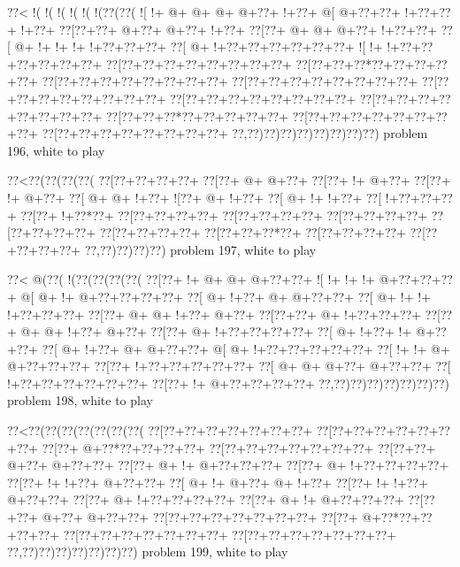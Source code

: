 \vbox{\vbox{\goo
\0??<\- !(\- !(\- !(\- !(\- !(\- !(\0??(\0??(
\- ![\- !+\- @+\- @+\- @+\- @+\0??+\- !+\0??+
\- @[\- @+\0??+\0??+\- !+\0??+\0??+\- !+\0??+
\0??[\0??+\0??+\- @+\0??+\- @+\0??+\- !+\0??+
\0??[\0??+\- @+\- @+\- @+\0??+\- !+\0??+\0??+
\0??[\- @+\- !+\- !+\- !+\- !+\0??+\0??+\0??+
\0??[\- @+\- !+\0??+\0??+\0??+\0??+\0??+\0??+
\- ![\- !+\- !+\0??+\0??+\0??+\0??+\0??+\0??+
\0??[\0??+\0??+\0??+\0??+\0??+\0??+\0??+\0??+
\0??[\0??+\0??+\0??*\0??+\0??+\0??+\0??+\0??+
\0??[\0??+\0??+\0??+\0??+\0??+\0??+\0??+\0??+
\0??[\0??+\0??+\0??+\0??+\0??+\0??+\0??+\0??+
\0??[\0??+\0??+\0??+\0??+\0??+\0??+\0??+\0??+
\0??[\0??+\0??+\0??+\0??+\0??+\0??+\0??+\0??+
\0??[\0??+\0??+\0??+\0??+\0??+\0??+\0??+\0??+
\0??[\0??+\0??+\0??*\0??+\0??+\0??+\0??+\0??+
\0??[\0??+\0??+\0??+\0??+\0??+\0??+\0??+\0??+
\0??[\0??+\0??+\0??+\0??+\0??+\0??+\0??+\0??+
\0??,\0??)\0??)\0??)\0??)\0??)\0??)\0??)\0??)
}
\hfil problem 196, white to play\hfil\break
}

\vbox{\vbox{\goo
\0??<\0??(\0??(\0??(\0??(
\0??[\0??+\0??+\0??+\0??+
\0??[\0??+\- @+\- @+\0??+
\0??[\0??+\- !+\- @+\0??+
\0??[\0??+\- !+\- @+\0??+
\0??[\- @+\- @+\- !+\0??+
\- ![\0??+\- @+\- !+\0??+
\0??[\- @+\- !+\- !+\0??+
\0??[\- !+\0??+\0??+\0??+
\0??[\0??+\- !+\0??*\0??+
\0??[\0??+\0??+\0??+\0??+
\0??[\0??+\0??+\0??+\0??+
\0??[\0??+\0??+\0??+\0??+
\0??[\0??+\0??+\0??+\0??+
\0??[\0??+\0??+\0??+\0??+
\0??[\0??+\0??+\0??*\0??+
\0??[\0??+\0??+\0??+\0??+
\0??[\0??+\0??+\0??+\0??+
\0??,\0??)\0??)\0??)\0??)
}
\hfil problem 197, white to play\hfil\break
}

\vbox{\vbox{\goo
\0??<\- @(\0??(\- !(\0??(\0??(\0??(\0??(
\0??[\0??+\- !+\- @+\- @+\- @+\0??+\0??+
\- ![\- !+\- !+\- !+\- @+\0??+\0??+\0??+
\- @[\- @+\- !+\- @+\0??+\0??+\0??+\0??+
\0??[\- @+\- !+\0??+\- @+\- @+\0??+\0??+
\0??[\- @+\- !+\- !+\- !+\0??+\0??+\0??+
\0??[\0??+\- @+\- @+\- !+\0??+\- @+\0??+
\0??[\0??+\0??+\- @+\- !+\0??+\0??+\0??+
\0??[\0??+\- @+\- @+\- !+\0??+\- @+\0??+
\0??[\0??+\- @+\- !+\0??+\0??+\0??+\0??+
\0??[\- @+\- !+\0??+\- !+\- @+\0??+\0??+
\0??[\- @+\- !+\0??+\- @+\- @+\0??+\0??+
\- @[\- @+\- !+\0??+\0??+\0??+\0??+\0??+
\0??[\- !+\- !+\- @+\- @+\0??+\0??+\0??+
\0??[\0??+\- !+\0??+\0??+\0??+\0??+\0??+
\0??[\- @+\- @+\- @+\0??+\- @+\0??+\0??+
\0??[\- !+\0??+\0??+\0??+\0??+\0??+\0??+
\0??[\0??+\- !+\- @+\0??+\0??+\0??+\0??+
\0??,\0??)\0??)\0??)\0??)\0??)\0??)\0??)
}
\hfil problem 198, white to play\hfil\break
}

\vbox{\vbox{\goo
\0??<\0??(\0??(\0??(\0??(\0??(\0??(\0??(
\0??[\0??+\0??+\0??+\0??+\0??+\0??+\0??+
\0??[\0??+\0??+\0??+\0??+\0??+\0??+\0??+
\0??[\0??+\- @+\0??*\0??+\0??+\0??+\0??+
\0??[\0??+\0??+\0??+\0??+\0??+\0??+\0??+
\0??[\0??+\0??+\- @+\0??+\- @+\0??+\0??+
\0??[\0??+\- @+\- !+\- @+\0??+\0??+\0??+
\0??[\0??+\- @+\- !+\0??+\0??+\0??+\0??+
\0??[\0??+\- !+\- !+\0??+\- @+\0??+\0??+
\0??[\- @+\- !+\- @+\0??+\- @+\- !+\0??+
\0??[\0??+\- !+\- !+\0??+\- @+\0??+\0??+
\0??[\0??+\- @+\- !+\0??+\0??+\0??+\0??+
\0??[\0??+\- @+\- !+\- @+\0??+\0??+\0??+
\0??[\0??+\0??+\- @+\0??+\- @+\0??+\0??+
\0??[\0??+\0??+\0??+\0??+\0??+\0??+\0??+
\0??[\0??+\- @+\0??*\0??+\0??+\0??+\0??+
\0??[\0??+\0??+\0??+\0??+\0??+\0??+\0??+
\0??[\0??+\0??+\0??+\0??+\0??+\0??+\0??+
\0??,\0??)\0??)\0??)\0??)\0??)\0??)\0??)
}
\hfil problem 199, white to play\hfil\break
}

